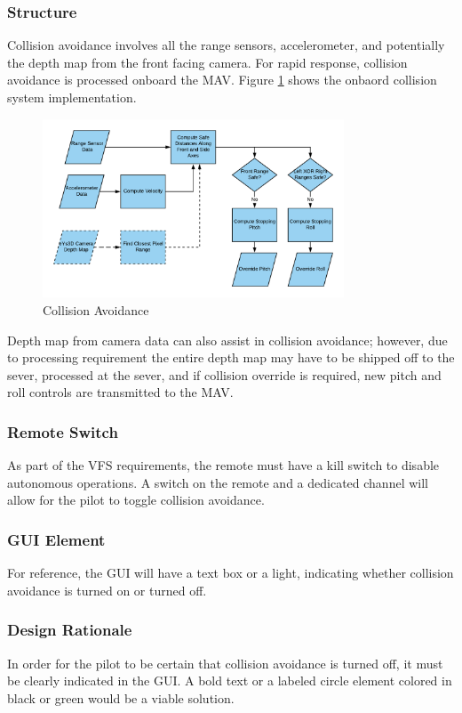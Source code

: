 \documentclass[onecolumn, draftclsnofoot, 10pt, compsoc]{IEEEtran}
\begin{document}
\subsubsection{Structure}
Collision avoidance involves all the range sensors, accelerometer, and potentially the depth map from the front facing camera. For rapid response, collision avoidance is processed onboard the MAV. Figure \ref{fig:ColAvo} shows the onbaord collision system implementation.
\begin{figure}[h]
    \centering
    \includegraphics[width=0.8\textwidth]{graphics/collision_avoidance.png}
    \caption{Collision Avoidance}
    \label{fig:ColAvo}
\end{figure}

Depth map from camera data can also assist in collision avoidance; however, due to processing requirement the entire depth map may have to be shipped off to the sever, processed at the sever, and if collision override is required, new pitch and roll controls are transmitted to the MAV.

\subsubsection{Remote Switch}
As part of the VFS requirements, the remote must have a kill switch to disable autonomous operations. A switch on the remote and a dedicated channel will allow for the pilot to toggle collision avoidance.

\subsubsection{GUI Element}
For reference, the GUI will have a text box or a light, indicating whether collision avoidance is turned on or turned off.

\subsubsection{Design Rationale}
In order for the pilot to be certain that collision avoidance is turned off, it must be clearly indicated in the GUI. A bold text or a labeled circle element colored in black or green would be a viable solution.
\end{document}
